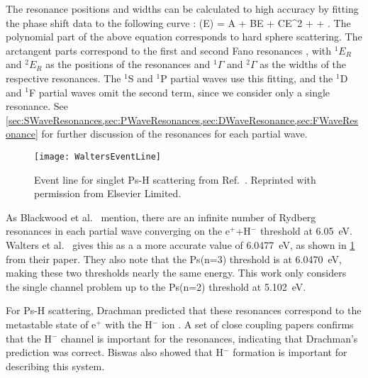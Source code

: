 \documentclass[Dissertation.tex]{subfiles}
\begin{document}
The resonance positions and widths can be calculated to high 
accuracy by fitting the phase shift data to the following curve \cite{VanReeth2004}:
\beq
\label{eq:ResonanceCurve}
\delta(E) = A + BE + CE^2 + \arctan{}
  + \arctan{}.
\eeq
The polynomial part of the above equation corresponds to hard sphere 
scattering. The arctangent parts correspond to the first and second Fano 
resonances \cite{Fano1961,Macek1970,Hazi1979}, with $^1E_R$ and $^2E_R$ as 
the positions of the resonances and $^1\Gamma$ and $^2\Gamma$ as the widths 
of the respective resonances. The $^1$S and $^1$P partial waves use this 
fitting, and the $^1$D and $^1$F partial waves omit the second term, since we 
consider only a single resonance. See
\cref{sec:SWaveResonances,sec:PWaveResonances,sec:DWaveResonance,sec:FWaveResonance}
for further discussion of the resonances for each partial wave.


\begin{figure}[H]
	\centering
	\texttt{[image: WaltersEventLine]}
	\caption[Event line for singlet Ps-H scattering]{Event line for singlet Ps-H scattering
from Ref.~\cite{Walters2004}. Reprinted with permission from Elsevier Limited.}
	\label{fig:WaltersEventLine}
\end{figure}

As Blackwood et al.\ \cite{Blackwood2002} mention, there are an infinite 
number of Rydberg resonances in each partial wave converging on the e$^+$+H$^-$
threshold at \SI{6.05}{eV}. Walters et al.\ \cite{Walters2004} gives this as a
a more accurate value of \SI{6.0477}{eV}, as shown in \cref{fig:WaltersEventLine}
from their paper. They also note that the Ps(n=3)
threshold is at \SI{6.0470}{eV}, making these two thresholds nearly the same
energy. This work only considers the single channel problem up to the Ps(n=2)
threshold at \SI{5.102}{eV}.

For Ps-H scattering, Drachman predicted that these resonances correspond to 
the metastable state of e$^+$ with the H$^-$ ion \cite{Drachman1979}. A set 
of close coupling papers \cite{Blackwood2002,Blackwood2002b,Walters2004} 
confirms that the H$^-$ channel is important for the resonances, indicating 
that Drachman's prediction was correct. Biswas \cite{Biswas2001} also showed 
that H$^-$ formation is important for describing this system.
\end{document}
